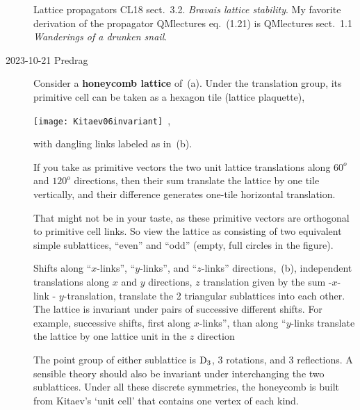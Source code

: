 \begin{description}
Lattice propagators
{CL18 sect.~3.2. \emph{Bravais lattice stability}}.
My favorite derivation of the propagator
{QMlectures eq.~(1.21)} is
{QMlectures sect.~1.1 {\em Wanderings of a drunken snail}}.

\item[2023-10-21 Predrag]
\newcommand{\pcell}{primitive cell}\newcommand{\Pcell}{Primitive cell}

Consider a \textbf{honeycomb lattice} of \,(a).
Under the translation group, its {\pcell} can be taken as a hexagon tile
(lattice plaquette),

\texttt{[image: Kitaev06invariant]}
\,,

with dangling links labeled as in \,(b).

If you take as primitive vectors the two unit lattice translations along
$60^o$ and $120^o$ directions, then their sum translate the lattice
by one tile vertically, and their difference generates
one-tile horizontal translation.

That might not be in your taste, as these primitive vectors are
orthogonal to  {\pcell} links.
So view the lattice as consisting of two equivalent simple sublattices,
``even'' and ``odd'' (empty, full circles in the figure).

Shifts along ``$x$-links'', ``$y$-links'', and ``$z$-links'' directions,
\,(b), independent translations
along $x$ and $y$ directions, $z$ translation given by the sum
-$x$-link - $y$-translation, translate the 2 triangular sublattices
into each other. The lattice is invariant under pairs of
successive different shifts. For example, successive shifts, first along
$x$-links'', than along ``$y$-links translate the lattice by one lattice unit in the $z$ direction

The point group of either sublattice is $\textrm{D}_{3}$, 3 rotations, and 3
reflections. A sensible theory should also be invariant under
interchanging the two sublattices. Under all these discrete symmetries,
the honeycomb is built from Kitaev's `unit cell' that contains one vertex
of each kind.


\end{description}
